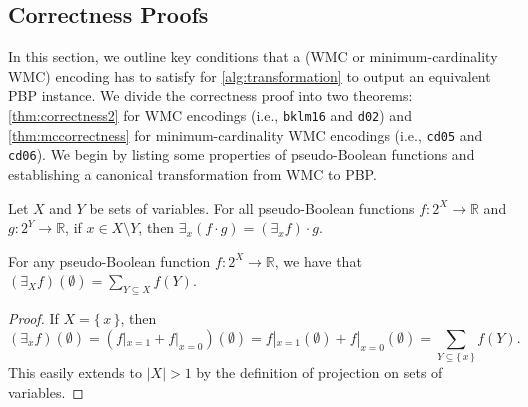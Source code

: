 \subsection{Correctness Proofs}\label{sec:proof}

In this section, we outline key conditions that a (WMC or minimum-cardinality
WMC) encoding has to satisfy for \cref{alg:transformation} to output an
equivalent PBP instance. We divide the correctness proof into two theorems:
\cref{thm:correctness2} for WMC encodings (i.e., \texttt{bklm16} and
\texttt{d02}) and \cref{thm:mccorrectness} for minimum-cardinality WMC encodings
(i.e., \texttt{cd05} and \texttt{cd06}). We begin by listing some properties of
pseudo-Boolean functions and establishing a canonical transformation from WMC to
PBP\@.

\begin{theorem}\label{thm:early}
  Let $X$ and $Y$ be sets of variables. For all pseudo-Boolean functions
  $f\colon 2^X \to \mathbb{R}$ and $g\colon 2^Y \to \mathbb{R}$, if $x \in X
  \setminus Y$, then $\exists_x (f \cdot g) = (\exists_x f) \cdot g$.
\end{theorem}

\begin{lemma}\label{lemma:sum}
  For any pseudo-Boolean function $f\colon 2^X \to \mathbb{R}$, we have that
  $(\exists_X f)(\emptyset) = \sum_{Y \subseteq X} f(Y)$.
\end{lemma}
\begin{proof}
  If $X = \{\, x \,\}$, then
  \[
    (\exists_{x}f)(\emptyset) = (f|_{x=1} + f|_{x=0})(\emptyset) = f|_{x=1}(\emptyset) + f|_{x=0}(\emptyset) = \sum_{Y \subseteq \{\, x \,\}} f(Y).
  \]
  This easily extends to $|X| > 1$ by the definition of projection on sets of
  variables.
\end{proof}


